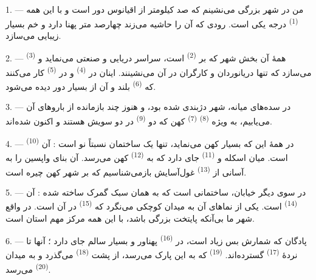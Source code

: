 \VUsaut{2.0mm}
\VUsaut{3.0mm}
\VUfilet{16mm}
\VUsaut{5.6mm}
\VUsaut{1.4mm}
\VUsaut{2.2mm}

\VUsaut{3.0mm}
\VUsaut{3.0mm}

1. --- من در شهر بزرگی می‌نشینم که صد کیلومتر از اقیانوس دور است و با
این همه  \textsuperscript{(1)} درجه یکی است. رودی که آن را
حاشیه می‌زند چهارصد متر پهنا دارد و خم بسیار زیبایی می‌سازد.

2. --- همهٔ آن بخش شهر که بر  \textsuperscript{(2)}
است، سراسر دریایی و صنعتی می‌نماید و 
\textsuperscript{(3)} می‌سازد که تنها دریانوردان و کارگران در آن
می‌نشینند. اینان در  \textsuperscript{(4)} و در
 \textsuperscript{(5)} کار می‌کنند که
 \textsuperscript{(6)} بلند و  آن از بسیار
دور دیده می‌شود.

3. --- در سده‌های میانه، شهر دژبندی شده بود، و هنوز چند بازمانده از
باروهای آن می‌یابیم، به ویژه  \textsuperscript{(8)}
 \textsuperscript{(7)} کهن که دو 
\textsuperscript{(9)} در دو سویش هستند و اکنون 
شده‌اند.

4. --- در همهٔ این  که بسیار کهن می‌نماید، تنها یک ساختمان
نسبتاً نو است : آن  \textsuperscript{(10)} است. میان اسکله
و  \textsuperscript{(11)} جای دارد که به  \textsuperscript{(12)} کهن می‌رسد. آن بنای واپسین را به آسانی از
 \textsuperscript{(13)} غول‌آسایش بازمی‌شناسیم که
بر شهر کهن چیره است.

5. --- در سوی دیگر خیابان، ساختمانی  است که به همان
سبک گمرک ساخته شده : آن  \textsuperscript{(14)} است. یکی
از نماهای آن به میدان کوچکی می‌نگرد که 
\textsuperscript{(15)} در آن است. در واقع شهر ما بی‌آنکه پایتخت بزرگی
باشد، با این همه مرکز مهم استان است.

\VUsaut{5.0mm}
\VUsaut{3.4mm}

6. --- پادگان که شمارش بس زیاد است، در 
\textsuperscript{(16)} پهناور و بسیار سالم جای دارد ؛ آنها تا نردهٔ
 \textsuperscript{(17)} گسترده‌اند. 
\textsuperscript{(19)} که به این پارک می‌رسد، از پشت  \textsuperscript{(18)} می‌گذرد و به میدان  \textsuperscript{(20)} می‌رسد.

